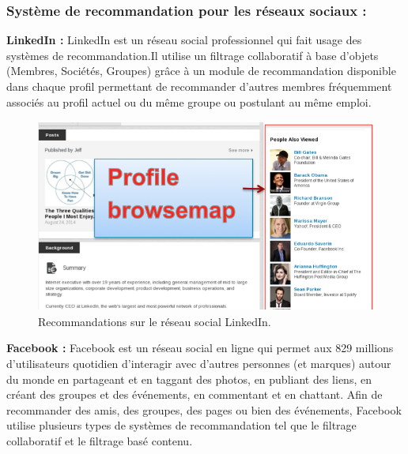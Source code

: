         \subsubsection*{Système de recommandation pour les réseaux sociaux :}
        \textbf{LinkedIn :} LinkedIn est un réseau social professionnel qui fait usage des systèmes de recommandation.Il utilise un filtrage collaboratif à base d'objets (Membres, Sociétés, Groupes) grâce à un module de recommandation disponible dans chaque profil permettant de recommander d'autres membres fréquemment associés au profil actuel ou du même groupe ou postulant au même emploi.\\
            \begin{figure}[H]
                \centering
                   \includegraphics[height=180pt,width=350pt]{img/chapter1/linkedin.png}
                \caption{Recommandations sur le réseau social LinkedIn.}
            \end{figure}

        \textbf{Facebook :} Facebook est un réseau social en ligne qui permet aux 829 millions d’utilisateurs quotidien \cite{userFacebook} d'interagir avec d'autres personnes (et marques) autour du monde en partageant et en taggant des photos, en publiant des liens, en créant des groupes et des événements, en commentant et en chattant. Afin de recommander des amis, des groupes, des pages ou bien des événements, Facebook utilise plusieurs types de systèmes de recommandation tel que le filtrage collaboratif et le filtrage basé contenu.\\ 

